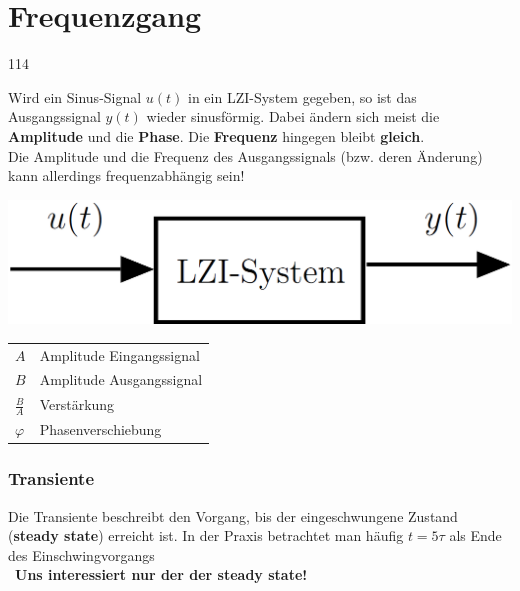 \section{Frequenzgang}{114} 

Wird ein Sinus-Signal $u(t)$ in ein LZI-System gegeben, so ist das Ausgangssignal $y(t)$ wieder sinusförmig.
Dabei ändern sich meist die \textbf{Amplitude} und die \textbf{Phase}.
Die \textbf{Frequenz} hingegen bleibt \textbf{gleich}.\\
Die Amplitude und die Frequenz des Ausgangssignals (bzw. deren Änderung) kann allerdings frequenzabhängig sein!

\begin{minipage}[c]{0.48\columnwidth}
    \includegraphics[width=\columnwidth]{images/lzi_system.png}
\end{minipage}
\hfill
\begin{minipage}[c]{0.48\columnwidth}
    \begin{tabular}{ll}
        $A$             & Amplitude Eingangssignal \\
        $B$             & Amplitude Ausgangssignal \\
        $\frac{B}{A}$   & Verstärkung \\
        $\varphi$       & Phasenverschiebung \\
    \end{tabular}
\end{minipage}


\subsubsection{Transiente}

 Die Transiente beschreibt den Vorgang, bis der eingeschwungene Zustand (\textbf{steady state}) erreicht ist.
 In der Praxis betrachtet man häufig $t = 5 \tau$ als Ende des Einschwingvorgangs \\
 \textrightarrow\ \textbf{Uns interessiert nur der der steady state!}


